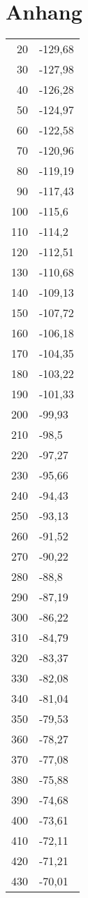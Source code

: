 \section{Anhang}
\begin{table}
\centering
\begin{tabular}{rl}
20	&	-129,68\\
30	&	-127,98\\
40	&	-126,28\\
50	&	-124,97\\
60	&	-122,58\\
70	&	-120,96\\
80	&	-119,19\\
90	&	-117,43\\
100	&	-115,6\\
110	&	-114,2\\
120	&	-112,51\\
130	&	-110,68\\
140	&	-109,13\\
150	&	-107,72\\
160	&	-106,18\\
170	&	-104,35\\
180	&	-103,22\\
190	&	-101,33\\
200	&	-99,93\\
210	&	-98,5\\
220	&	-97,27\\
230	&	-95,66\\
240	&	-94,43\\
250	&	-93,13\\
260	&	-91,52\\
270	&	-90,22\\
280	&	-88,8\\
290	&	-87,19\\
300	&	-86,22\\
310	&	-84,79\\
320	&	-83,37\\
330	&	-82,08\\
340	&	-81,04\\
350	&	-79,53\\
360	&	-78,27\\
370	&	-77,08\\
380	&	-75,88\\
390	&	-74,68\\
400	&	-73,61\\
410	&	-72,11\\
420	&	-71,21\\
430	&	-70,01\\

\end{tabular}
\end{table}
